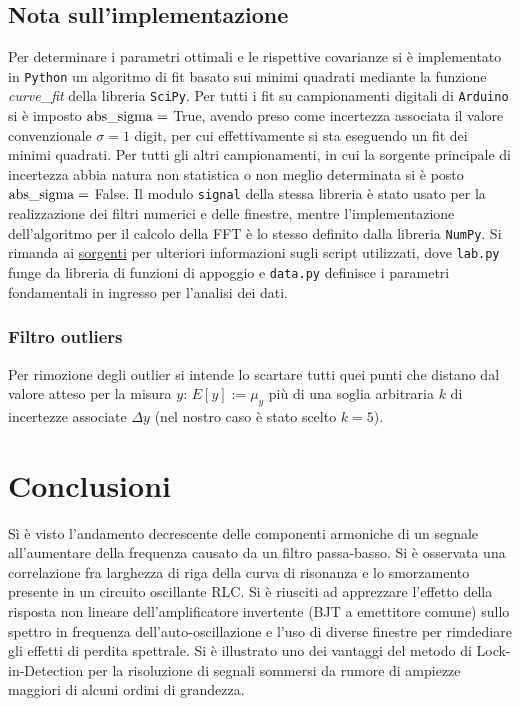 \documentclass{article}[a4paper, oneside, 11pt]
\begin{document}
\subsection{Nota sull'implementazione}
Per determinare i parametri ottimali e le rispettive covarianze si \`e
implementato in \verb+Python+ un algoritmo di fit basato sui minimi quadrati
mediante la funzione \emph{curve\_fit} della libreria 
\texttt{SciPy}\cite{scipy}.
Per tutti i fit su campionamenti digitali di \verb+Arduino+ si \`e imposto
$\rm{abs\_sigma} =$ True, avendo preso come incertezza associata il valore
convenzionale $\sigma = 1$ digit, per cui effettivamente si sta eseguendo
un fit dei minimi quadrati. Per tutti gli altri campionamenti, in cui la
sorgente principale di incertezza abbia natura non statistica o non meglio
determinata si è posto $\rm{abs\_sigma} =$ False. 
Il modulo \texttt{signal} della stessa libreria è stato usato per
la realizzazione dei filtri numerici e delle finestre, mentre
l'implementazione dell'algoritmo per il calcolo della FFT è lo stesso
definito dalla libreria \texttt{NumPy}\cite{numpy}.
Si rimanda ai
\href{https://github.com/BernardoTomelleri/FFT/tree/master}{sorgenti}
per ulteriori informazioni sugli script utilizzati, dove \verb+lab.py+ funge
da libreria di funzioni di appoggio e \verb+data.py+ definisce i parametri
fondamentali in ingresso per l'analisi dei dati.
\subsubsection{Filtro outliers}
Per rimozione degli outlier si intende lo scartare tutti quei punti che
distano dal valore atteso per la misura $y$: $E[y] := \mu_y$ pi\`u di una
soglia arbitraria $k$ di incertezze associate $\Delta y$
(nel nostro caso \`e stato scelto $k = 5$).

\section{Conclusioni}
Sì è visto l'andamento decrescente delle componenti armoniche di un segnale
all'aumentare della frequenza causato da un filtro passa-basso.
Si è osservata una correlazione fra larghezza di riga della curva di risonanza
e lo smorzamento presente in un circuito oscillante RLC.
Si è riusciti ad apprezzare l'effetto della risposta non lineare
dell'amplificatore invertente (BJT a emettitore comune) sullo spettro
in frequenza dell'auto-oscillazione e l'uso di diverse finestre per
rimdediare gli effetti di perdita spettrale.
Si è illustrato uno dei vantaggi del metodo di Lock-in-Detection per 
la risoluzione di segnali sommersi da rumore di ampiezze maggiori di alcuni
ordini di grandezza.

\medskip


\end{document}
